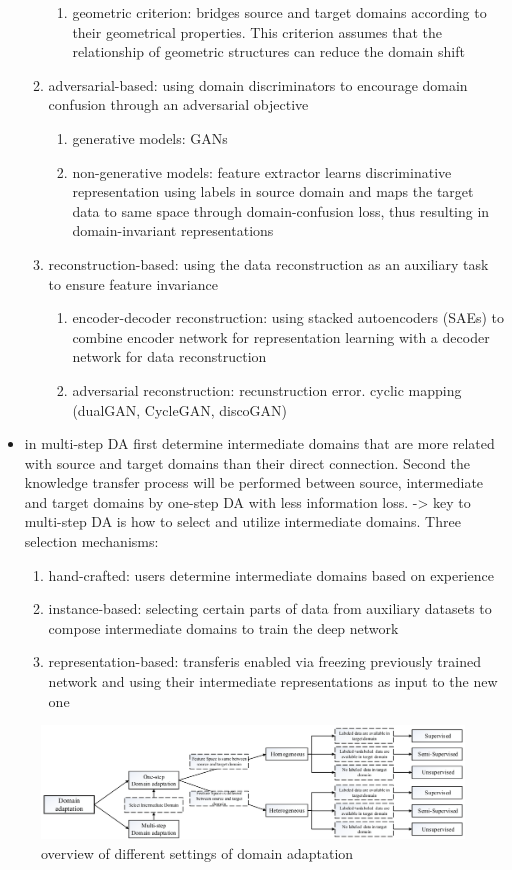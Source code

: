 \documentclass[]{article}
\begin{document}
\begin{itemize}
\begin{enumerate}
\begin{enumerate}
			\item geometric criterion: bridges source and target domains according to their geometrical properties. This criterion assumes that the relationship of geometric structures can reduce the domain shift
		\end{enumerate}
		\item adversarial-based: using domain discriminators to encourage domain confusion through an adversarial objective
		\begin{enumerate}
			\item generative models: GANs
			\item non-generative models: feature extractor learns discriminative representation using labels in source domain and maps the target data to same space through domain-confusion loss, thus resulting in domain-invariant representations
		\end{enumerate}
		\item reconstruction-based: using the data reconstruction as an auxiliary task to ensure feature invariance
		\begin{enumerate}
			\item encoder-decoder reconstruction: using stacked autoencoders (SAEs) to combine encoder network for representation learning with a decoder network for data reconstruction
			\item adversarial reconstruction: recunstruction error. cyclic mapping (dualGAN, CycleGAN, discoGAN)
		\end{enumerate}
	\end{enumerate}
	\item in multi-step DA first determine intermediate domains that are more related with source and target domains than their direct connection. Second the knowledge transfer process will be performed between source, intermediate and target domains by one-step DA with less information loss. -> key to multi-step DA is how to select and utilize intermediate domains. Three selection mechanisms:
	\begin{enumerate}
		\item hand-crafted: users determine intermediate domains based on experience
		\item instance-based: selecting certain parts of data from auxiliary datasets to compose intermediate domains to train the deep network
		\item representation-based: transferis enabled via freezing previously trained network and using their intermediate representations as input to the new one
	\end{enumerate}
\end{itemize}

\begin{figure}
	\centering
	\includegraphics[width=\textwidth]{../images/overview_DA_settings.png}
	\caption{overview of different settings of domain adaptation}
	\label{fig:overview_DA_settings}
\end{figure}
\end{document}
